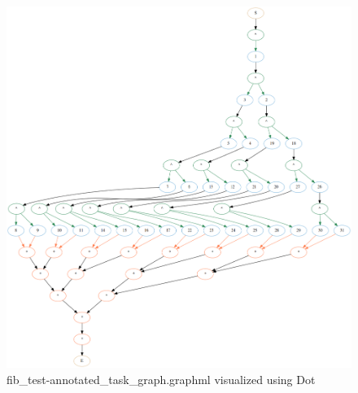 \documentclass[11pt,a4paper,notitlepage]{article}
\begin{document}
\begin{figure}[!ht]
\centering
\includegraphics[width=\textwidth]{figures/fib_test-10_4-annotated_task_graph.png}
\caption{fib\_test-annotated\_task\_graph.graphml visualized using Dot}
\label{fig:dot-atg}
\end{figure}
\end{document}
